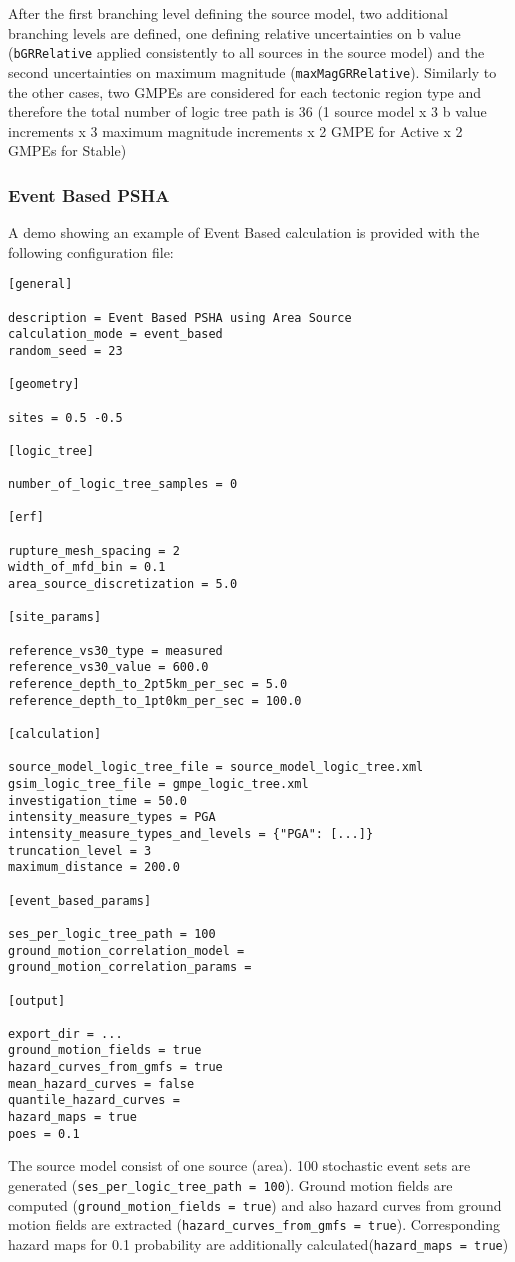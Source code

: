 After the first branching level defining the source model, two additional branching levels are defined, one defining
relative uncertainties on b value (\texttt{bGRRelative} applied consistently to all sources in the source model)
and the second uncertainties on maximum magnitude (\texttt{maxMagGRRelative}). Similarly to the other cases,
two GMPEs are considered for each tectonic region type and therefore the total number of logic tree path is 36
(1 source model x 3 b value increments x 3 maximum magnitude increments x 2 GMPE for Active x 2 GMPEs for Stable)

\subsubsection{Event Based PSHA}
A demo showing an example of Event Based calculation is provided with the following configuration file:
\begin{Verbatim}[frame=single, commandchars=\\\{\}, fontsize=\normalsize]
[general]

description = Event Based PSHA using Area Source
calculation_mode = event_based
random_seed = 23

[geometry]

sites = 0.5 -0.5

[logic_tree]

number_of_logic_tree_samples = 0

[erf]

rupture_mesh_spacing = 2
width_of_mfd_bin = 0.1
area_source_discretization = 5.0

[site_params]

reference_vs30_type = measured
reference_vs30_value = 600.0
reference_depth_to_2pt5km_per_sec = 5.0
reference_depth_to_1pt0km_per_sec = 100.0

[calculation]

source_model_logic_tree_file = source_model_logic_tree.xml
gsim_logic_tree_file = gmpe_logic_tree.xml
investigation_time = 50.0
intensity_measure_types = PGA
intensity_measure_types_and_levels = {"PGA": [...]}
truncation_level = 3
maximum_distance = 200.0

[event_based_params]

ses_per_logic_tree_path = 100
ground_motion_correlation_model =
ground_motion_correlation_params =

[output]

export_dir = ...
ground_motion_fields = true
hazard_curves_from_gmfs = true
mean_hazard_curves = false
quantile_hazard_curves =
hazard_maps = true
poes = 0.1
\end{Verbatim}
The source model consist of one source (area). 100 stochastic event sets are generated (\texttt{ses\_\-per\_\-logic\_\-tree\_\-path = 100}). Ground motion fields
are computed (\texttt{ground\_\-motion\_\-fields = true}) and also hazard curves from ground motion fields are extracted (\texttt{hazard\_\-curves\_\-from\_\-gmfs = true}).
Corresponding hazard maps for 0.1 probability are additionally calculated(\texttt{hazard\_\-maps = true})

